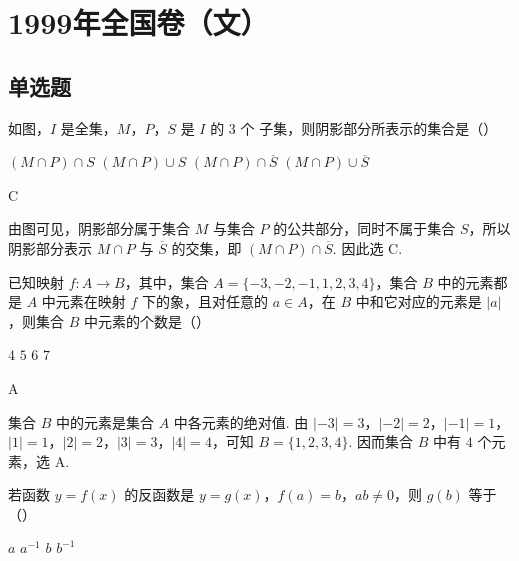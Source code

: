 \chapter{1999年全国卷（文）}
\section{单选题}

\begin{problem}
如图，\(I\) 是全集，\(M\)，\(P\)，\(S\) 是 \(I\) 的 \(3\text{ 个}\) 子集，则阴影部分所表示的集合是（\quad）


\choices
    {\((M\cap P)\cap S\)}
    {\((M\cap P)\cup S\)}
    {\((M\cap P)\cap \overline{S}\)}
    {\((M\cap P)\cup \overline{S}\)}
\end{problem}

\begin{answer}
C
\end{answer}

\begin{solution}
由图可见，阴影部分属于集合 \(M\) 与集合 \(P\) 的公共部分，同时不属于集合 \(S\)，所以阴影部分表示
\(M\cap P\) 与 \(\overline{S}\) 的交集，即 \((M\cap P)\cap\overline{S}\). 因此选 C.
\end{solution}

\begin{problem}
已知映射 \(f: A \to B \)，其中，集合 \(A = \{-3, -2, -1, 1, 2, 3, 4\} \)，集合 \(B\) 中的元素都是 \(A\) 中元素在映射 \(f \) 下的象，且对任意的 \(a \in A \)，在 \(B\) 中和它对应的元素是 \(|a| \)，则集合 \(B\) 中元素的个数是（\quad）

\choices
    {\(4\)}
    {\(5\)}
    {\(6\)}
    {\(7\)}
\end{problem}

\begin{answer}
A
\end{answer}

\begin{solution}
集合 \(B\) 中的元素是集合 \(A\) 中各元素的绝对值. 由
\(\lvert-3\rvert=3\)，\(\lvert-2\rvert=2\)，\(\lvert-1\rvert=1\)，\(\lvert1\rvert=1\)，\(\lvert2\rvert=2\)，\(\lvert3\rvert=3\)，\(\lvert4\rvert=4\)，可知
\(B=\{1,2,3,4\}\). 因而集合 \(B\) 中有 \(4\) 个元素，选 A.
\end{solution}

\begin{problem}
若函数 \(y=f(x)\) 的反函数是 \(y=g(x)\)，\(f(a)=b\)，\(ab\neq0\)，则 \(g(b)\) 等于（\quad）

\choices
    {\(a\)}
    {\(a^{-1}\)}
    {\(b\)}
    {\(b^{-1}\)}
\end{problem}

